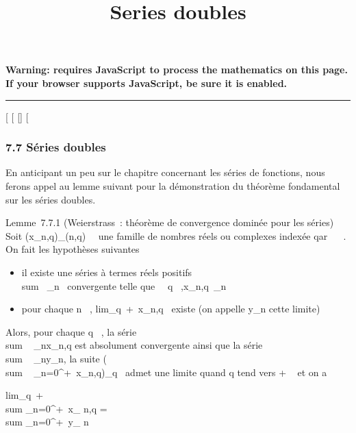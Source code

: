 \documentclass[]{article}
\title{Series doubles}
\author{}
\date{}
\begin{document}
\maketitle

\textbf{Warning: 
requires JavaScript to process the mathematics on this page.\\ If your
browser supports JavaScript, be sure it is enabled.}

\begin{center}\rule{3in}{0.4pt}\end{center}

{[}
{[}
{[}{]}
{[}

\subsubsection{7.7 Séries doubles}

En anticipant un peu sur le chapitre concernant les séries de fonctions,
nous ferons appel au lemme suivant pour la démonstration du théorème
fondamental sur les séries doubles.

Lemme~7.7.1 (Weierstrass~: théorème de convergence dominée pour les
séries) Soit (x\_n,q)\_(n,q)\in{}~\times{}~ une famille de nombres
réels ou complexes indexée qar ~ \times {}~. On fait les hypothèses suivantes

\begin{itemize}
\itemsep1pt\parskip0pt
\item
  il existe une séries à termes réels positifs
  \\sum  \alpha~\_n~
  convergente telle que \forall~~q \in
  ~,\textbar{}x\_n,q\textbar{}\leq \alpha~\_n
\item
  pour chaque n \in {}~,
  lim\_q\rightarrow~+\infty~x\_n,q~ existe (on
  appelle y\_n cette limite)
\end{itemize}

Alors, pour chaque q \in {}~, la série
\\sum ~
\_nx\_n,q est absolument convergente ainsi que la série
\\sum ~
\_ny\_n, la suite \left
(\\sum ~
\_n=0^+\infty~x\_n,q\right )\_q\in{}~
admet une limite quand q tend vers + \infty~ et on a

lim\_q\rightarrow~+\infty~~\\sum
\_n=0^+\infty~x\_ n,q = \\sum
\_n=0^+\infty~y\_ n
\end{document}
